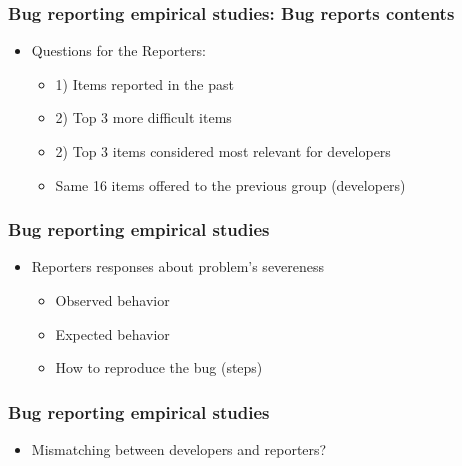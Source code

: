 \documentclass{beamer}
\begin{document}

\begin{frame}
 \frametitle{Bug reporting empirical studies: Bug reports contents}
 \begin{itemize}
    \item Questions for the Reporters:
      \begin{itemize}
      \item 1) Items reported in the past
      \item 2) Top 3 more difficult items
      \item 2) Top 3 items considered most relevant for developers
      \item Same 16 items offered to the previous group (developers)
      \end{itemize}
 \end{itemize}
\end{frame}


\begin{frame}
 \frametitle{Bug reporting empirical studies}
 \begin{itemize}
    \item Reporters responses about problem's severeness
        \begin{itemize}
        \item Observed behavior
        \item Expected behavior
        \item How to reproduce the bug (steps)
        \end{itemize}
 \end{itemize}
\end{frame}


\begin{frame}
 \frametitle{Bug reporting empirical studies}
 \begin{itemize}
    \item Mismatching between developers and reporters?
 \end{itemize}
\end{frame}

\end{document}
